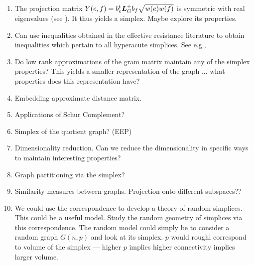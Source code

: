 \begin{enumerate}
	\item The projection matrix $Y(e,f)=b_e^t \vb*{L}_G^+b_f\sqrt{w(e)w(f)}$ is symmetric with real eigenvalues (see \cite{vishnoi2013lx}). It thus yields a simplex. Maybe explore its properties. 
	\item Can use inequalities obtained in the effective resistance literature to obtain inequalities which pertain to all hyperacute simplices. See e.g.,\cite{alev2017graph} 
\item Do low rank approximations of the gram matrix maintain any of the simplex properties? This yields a smaller representation of the graph ... what properties does this representation have?
\item Embedding approximate distance matrix. 
\item Applications of Schur Complement? 
    \item Simplex of the quotient graph? (EEP)

    \item Dimensionality reduction. Can we reduce the dimensionality in specific ways to maintain interesting properties? 
    \item Graph partitioning via the simplex? 
    \item Similarity measures between graphs. Projection onto different subspaces??
         
    \item We could use the correspondence to develop a theory of random simplices. This could be a useful model. Study the random geometry of simplices via this correspondence. The random model could simply be to consider a random graph $G(n,p)$ and look at its simplex. $p$ would roughl correspond to volume of the simplex --- higher $p$ implies higher connectivity implies larger volume. 
   
\end{enumerate}
